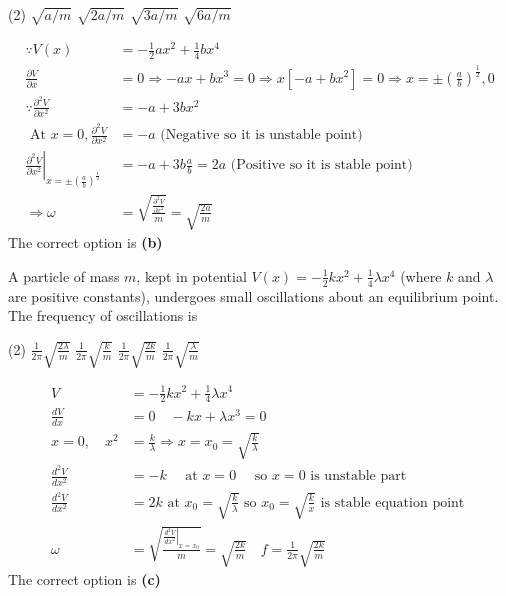 \begin{enumerate}
	\begin{tasks}(2)
		\task[\textbf{A.}] $\sqrt{a / m}$
		\task[\textbf{B.}]$\sqrt{2 a / m}$
		\task[\textbf{C.}]$\sqrt{3 a / m}$
		\task[\textbf{D.}]$\sqrt{6 a / m}$
	\end{tasks}
	\begin{answer}
		\begin{align*}
		\because V(x)&=-\frac{1}{2} a x^{2}+\frac{1}{4} b x^{4}	\\
		\frac{\partial V}{\partial x}&=0 \Rightarrow-a x+b x^{3}=0 \Rightarrow x\left[-a+b x^{2}\right]=0 \Rightarrow x=\pm\left(\frac{a}{b}\right)^{\frac{1}{2}}, 0\\
		\because \frac{\partial^{2} V}{\partial x^{2}}&=-a+3 b x^{2}\\
		\text { At } x=0, \frac{\partial^{2} V}{\partial x^{2}}&=-a \text { (Negative so it is unstable point) }\\
		\left.\frac{\partial^{2} V}{\partial x^{2}}\right|_{x=\pm\left(\frac{a}{b}\right)^{\frac{1}{2}}}&=-a+3 b \frac{a}{b}=2 a \text { (Positive so it is stable point) }\\
		\Rightarrow \omega&=\sqrt{\frac{\frac{\partial^{2} V}{\partial x^{2}}}{m}}=\sqrt{\frac{2 a}{m}}
		\end{align*}
		The correct option is \textbf{(b)}
	\end{answer}
	\begin{minipage}{\textwidth}
		\item A particle of mass $m$, kept in potential $V(x)=-\frac{1}{2} k x^{2}+\frac{1}{4} \lambda x^{4}$ (where $k$ and $\lambda$ are positive constants), undergoes small oscillations about an equilibrium point. The frequency of oscillations is
	\end{minipage}
	\begin{tasks}(2)
		\task[\textbf{A.}] $\frac{1}{2 \pi} \sqrt{\frac{2 \lambda}{m}}$
		\task[\textbf{B.}]$\frac{1}{2 \pi} \sqrt{\frac{k}{m}}$
		\task[\textbf{C.}]$\frac{1}{2 \pi} \sqrt{\frac{2 k}{m}}$
		\task[\textbf{D.}]$\frac{1}{2 \pi} \sqrt{\frac{\lambda}{m}}$
	\end{tasks}
	\begin{answer}
		\begin{align*}
		V&=-\frac{1}{2} k x^{2}+\frac{1}{4} \lambda x^{4}\\
		\frac{d V}{d x}&=0 \quad-k x+\lambda x^{3}=0\\
		x=0, \quad x^{2}&=\frac{k}{\lambda} \Rightarrow x=x_{0}=\sqrt{\frac{k}{\lambda}}\\
		\frac{d^{2} V}{d x^{2}}&=-k \quad \text { at } x=0 \quad \text { so } x=0 \text { is unstable part }\\
		\frac{d^{2} V}{d x^{2}}&=2 k \text { at } x_{0}=\sqrt{\frac{k}{\lambda}} \text { so } x_{0}=\sqrt{\frac{k}{x}} \text { is stable equation point }\\
		\omega&=\sqrt{\frac{\left.\frac{d^{2} V}{d x^{2}}\right|_{x=x_{0}}}{m}}=\sqrt{\frac{2 k}{m}} \quad f=\frac{1}{2 \pi} \sqrt{\frac{2 k}{m}}
		\end{align*}
		The correct option is \textbf{(c)}
	\end{answer}
\end{enumerate}